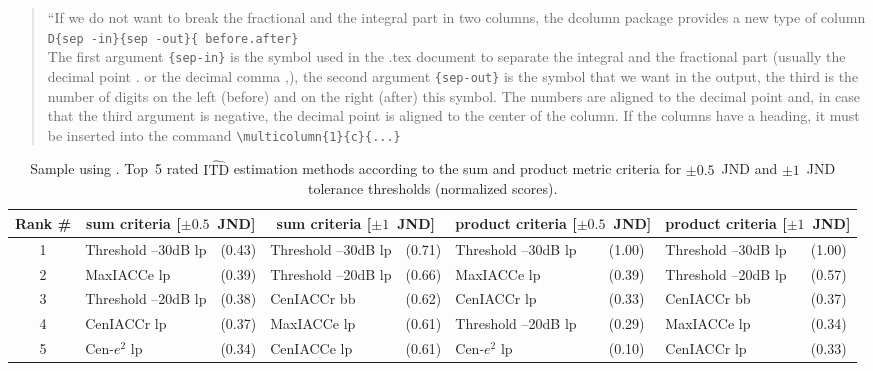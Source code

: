 \documentclass[reprint]{JASA}
\begin{document}
\begin{quote}
``If we do not want to break the fractional and the integral part in two columns,
the dcolumn package provides a new type of column\\
\verb+D{sep -in}{sep -out}{ before.after}+\\
The first argument \verb+{sep-in}+ is the symbol used in the
.tex document to separate
the integral and the fractional part (usually the decimal point . or the decimal
comma ,), the second argument \verb+{sep-out}+
is the symbol that we want in the
output, the third is the number of digits on the left (before) and on the right
(after) this symbol. The numbers are aligned to the decimal point and, in case
that the third argument is negative, the decimal point is aligned to the center of
the column. If the columns have a heading, it must be inserted into
the command \verb+\multicolumn{1}{c}{...}+
\end{quote}



\onecolumngrid

\begin{table}[b]
\caption{Sample using {\tt\string\adjustbox}. Top~5 rated $\widehat{\textrm{ITD}}$ estimation methods
according to the sum and product metric criteria for $\pm0.5$~JND and
$\pm1$~JND tolerance thresholds (normalized scores).}

\begin{adjustbox}{width=\textwidth}
\begin{tabular}{c| l l| l l| l l| l l}
\hline\hline
Rank \#& \multicolumn{2}{c}{sum criteria [$\pm0.5$~JND]} &
\multicolumn{2}{|c}{sum criteria [$\pm1$~JND]} &
\multicolumn{2}{|c}{product criteria [$\pm0.5$~JND]} & \multicolumn{2}{|c}{product criteria [$\pm1$~JND]}\\ 
\hline
1 & Threshold --30dB {lp} & (0.43) & Threshold --30dB {lp} & (0.71) & Threshold --30dB {lp} & (1.00) & Threshold --30dB {lp} & (1.00) \\ 
2 & MaxIACCe {lp} & (0.39) & Threshold --20dB {lp} & (0.66) & MaxIACCe {lp} & (0.39) & Threshold --20dB {lp} & (0.57) \\ 
3 & Threshold --20dB {lp} & (0.38) & CenIACCr {bb} &(0.62) & CenIACCr {lp} &(0.33) & CenIACCr {bb} & (0.37) \\ 
4 & CenIACCr {lp} &(0.37) & MaxIACCe {lp} & (0.61) & Threshold --20dB {lp} & (0.29) & MaxIACCe {lp} & (0.34) \\ 
5 & Cen-$e^2$ {lp} &(0.34) & CenIACCe {lp} & (0.61) & Cen-$e^2$ {lp}
& (0.10) & CenIACCr {lp} & (0.33) \\
\hline\hline
\end{tabular}
\end{adjustbox}

\label{tab:topMethods} 
\end{table}
\vskip1in
\clearpage
\twocolumngrid
\end{document}
